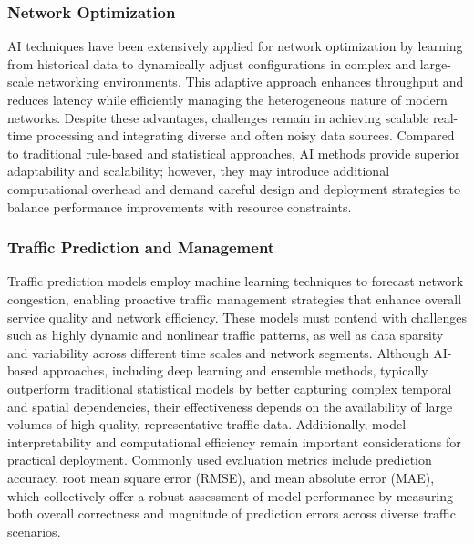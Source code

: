 \documentclass[sigconf]{acmart}
\begin{document}
\subsubsection{Network Optimization}
AI techniques have been extensively applied for network optimization by learning from historical data to dynamically adjust configurations in complex and large-scale networking environments. This adaptive approach enhances throughput and reduces latency while efficiently managing the heterogeneous nature of modern networks. Despite these advantages, challenges remain in achieving scalable real-time processing and integrating diverse and often noisy data sources. Compared to traditional rule-based and statistical approaches, AI methods provide superior adaptability and scalability; however, they may introduce additional computational overhead and demand careful design and deployment strategies to balance performance improvements with resource constraints.

\subsubsection{Traffic Prediction and Management}
Traffic prediction models employ machine learning techniques to forecast network congestion, enabling proactive traffic management strategies that enhance overall service quality and network efficiency. These models must contend with challenges such as highly dynamic and nonlinear traffic patterns, as well as data sparsity and variability across different time scales and network segments. Although AI-based approaches, including deep learning and ensemble methods, typically outperform traditional statistical models by better capturing complex temporal and spatial dependencies, their effectiveness depends on the availability of large volumes of high-quality, representative traffic data. Additionally, model interpretability and computational efficiency remain important considerations for practical deployment. Commonly used evaluation metrics include prediction accuracy, root mean square error (RMSE), and mean absolute error (MAE), which collectively offer a robust assessment of model performance by measuring both overall correctness and magnitude of prediction errors across diverse traffic scenarios.
\end{document}
